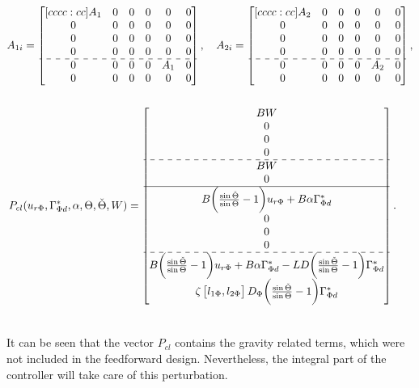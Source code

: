 \documentclass[main.tex]{subfiles}
\begin{document}
\begin{align*}
		A_{1i} &= 
		\begin{bmatrix}[cccc:cc]
		A_1 & 0 & 0 & 0 & 0 & 0\\
		0 & 0 & 0 & 0 & 0 & 0\\
		0 & 0 & 0 & 0 & 0 & 0\\
		0 & 0 & 0 & 0 & 0 & 0\\ \hdashline
		0 & 0 & 0 & 0 & A_1 & 0\\ 
		0 & 0 & 0 & 0 & 0 & 0
		\end{bmatrix}, \quad
		A_{2i} = 
		\begin{bmatrix}[cccc:cc]
		A_2 & 0 & 0 & 0 & 0 & 0\\
		0 & 0 & 0 & 0 & 0 & 0\\
		0 & 0 & 0 & 0 & 0 & 0\\
		0 & 0 & 0 & 0 & 0 & 0\\ \hdashline
		0 & 0 & 0 & 0 & A_2 & 0\\ 
		0 & 0 & 0 & 0 & 0 & 0
		\end{bmatrix}, \nonumber \\
	\nonumber \\
		P_{cl}&(u_{r\Phi},\Gamma_{\Phi d}^*,\alpha, \Theta,\check{\Theta},W) = \begin{bmatrix}
		BW \\
		0 \\
		0 \\
		0 \\ \hdashline
		BW \\
		0 \\ \hline
		B \bigg(\frac{\sin \check{\Theta}}{\sin \Theta} - 1\bigg) u_{r\Phi} + B\alpha\Gamma_{\Phi d}^*\\
		0 \\
		0 \\
		0 \\ \hdashline
		B \bigg(\frac{\sin \check{\Theta}}{\sin \Theta} - 1\bigg) u_{r\Phi} + B\alpha\Gamma_{\Phi d}^* - LD\bigg( \frac{\sin \check{\Theta}}{\sin \Theta}-1\bigg)\Gamma_{\Phi d}^*\\
		\zeta \begin{bmatrix}l_{1\Phi} , l_{2\Phi}\end{bmatrix} D_\Phi\bigg( \frac{\sin \check{\Theta}}{\sin \Theta} - 1\bigg)\Gamma_{\Phi d}^* \\		
		\end{bmatrix}.
		\\\nonumber
	\end{align*}
	
	It can be seen that the vector $P_{cl}$ contains the gravity related terms, which were not included in the feedforward design. Nevertheless, the integral part of the controller will take care of this perturbation.
	
\end{document}
